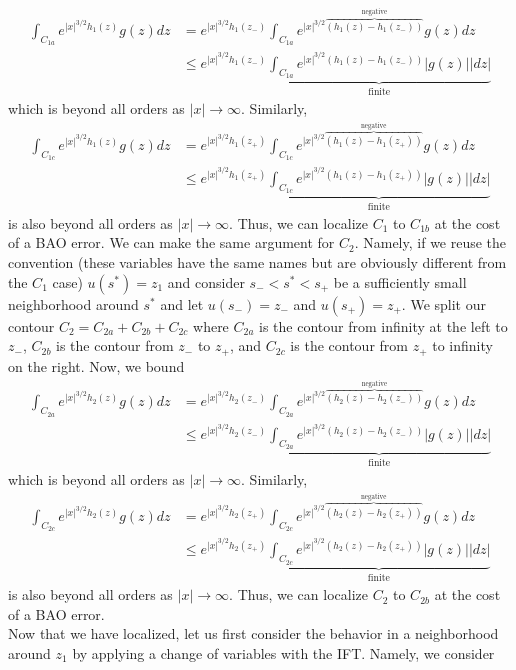 \documentclass{article}
\begin{document}
\begin{align*}
\int_{C_{1a}}e^{|x|^{3/2}h_1(z)}g(z)dz&=e^{|x|^{3/2}h_1(z_-)}\int_{C_{1a}}e^{|x|^{3/2}\overbrace{(h_1(z)-h_1(z_-))}^{\text{negative}}}g(z)dz\\&\leq
e^{|x|^{3/2}h_1(z_-)}\underbrace{\int_{C_{1a}}e^{|x|^{3/2}(h_1(z)-h_1(z_-))}|g(z)||dz|}_{\text{finite}}
\end{align*}
which is beyond all orders as $|x|\to\infty$. Similarly,
\begin{align*}
\int_{C_{1c}}e^{|x|^{3/2}h_1(z)}g(z)dz&=e^{|x|^{3/2}h_1(z_+)}\int_{C_{1c}}e^{|x|^{3/2}\overbrace{(h_1(z)-h_1(z_+))}^{\text{negative}}}g(z)dz\\&\leq
e^{|x|^{3/2}h_1(z_+)}\underbrace{\int_{C_{1c}}e^{|x|^{3/2}(h_1(z)-h_1(z_+))}|g(z)||dz|}_{\text{finite}}
\end{align*}
is also beyond all orders as $|x|\to\infty$. Thus, we can localize $C_1$ to $C_{1b}$ at the cost of a BAO error. We can make the same argument for $C_2$. Namely, if we reuse the convention (these variables have the same names but are obviously different from the $C_1$ case) $u(s^*)=z_1$ and consider $s_-<s^*<s_+$ be a sufficiently small neighborhood around $s^*$ and let $u(s_-)=z_-$ and $u(s_+)=z_+$. We split our contour $C_2=C_{2a}+C_{2b}+C_{2c}$ where $C_{2a}$ is the contour from infinity at the left to $z_-$, $C_{2b}$ is the contour from $z_-$ to $z_+$, and $C_{2c}$ is the contour from $z_+$ to infinity on the right. Now, we bound
\begin{align*}
\int_{C_{2a}}e^{|x|^{3/2}h_2(z)}g(z)dz&=e^{|x|^{3/2}h_2(z_-)}\int_{C_{2a}}e^{|x|^{3/2}\overbrace{(h_2(z)-h_2(z_-))}^{\text{negative}}}g(z)dz\\&\leq
e^{|x|^{3/2}h_2(z_-)}\underbrace{\int_{C_{2a}}e^{|x|^{3/2}(h_2(z)-h_2(z_-))}|g(z)||dz|}_{\text{finite}}
\end{align*}
which is beyond all orders as $|x|\to\infty$. Similarly,
\begin{align*}
\int_{C_{2c}}e^{|x|^{3/2}h_2(z)}g(z)dz&=e^{|x|^{3/2}h_2(z_+)}\int_{C_{2c}}e^{|x|^{3/2}\overbrace{(h_2(z)-h_2(z_+))}^{\text{negative}}}g(z)dz\\&\leq
e^{|x|^{3/2}h_2(z_+)}\underbrace{\int_{C_{2c}}e^{|x|^{3/2}(h_2(z)-h_2(z_+))}|g(z)||dz|}_{\text{finite}}
\end{align*}
is also beyond all orders as $|x|\to\infty$. Thus, we can localize $C_2$ to $C_{2b}$ at the cost of a BAO error.\\
Now that we have localized, let us first consider the behavior in a neighborhood around $z_1$ by applying a change of variables with the IFT. Namely, we consider 
\end{document}
